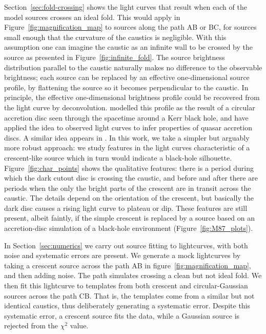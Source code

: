 \documentclass[usenatbib]{mn2e}
\begin{document}
Section~\ref{sec:fold-crossing} shows the light curves that result
when each of the model sources crosses an ideal fold.  This would
apply in Figure~\ref{fig:magnification_map} to sources along the path
AB or BC, for sources small enough that the curvature of the caustics
is negligible.  With this assumption one can imagine the caustic as an
infinite wall to be crossed by the source as presented in
Figure~\ref{fig:infinite_fold}.  The source brightness distribution
parallel to the caustic naturally makes no difference to the
observable brightness; each source can be replaced by an effective
one-dimensional source profile, by flattening the source so it becomes
perpendicular to the caustic.  In principle, the effective
one-dimensional brightness profile could be recovered from the light
curve by deconvolution.  \cite{1999ApJ...524...49A} modelled this
profile as the result of a circular accretion disc seen through the
spacetime around a Kerr black hole, and \cite{2012MNRAS.423..676A}
have applied the idea to observed light curves to infer properties of
quasar accretion discs.  A similar idea appears in
\cite{2013ApJ...769..131C}.  In this work, we take a simpler but
arguably more robust approach: we study features in the light curves
characteristic of a crescent-like source which in turn would indicate
a black-hole silhouette.  Figure~\ref{fig:char_points} shows the
qualitative features: there is a period during which the dark cutout
disc is crossing the caustic, and before and after there are periods
when the only the bright parts of the crescent are in transit across
the caustic.  The details depend on the orientation of the crescent,
but basically the dark disc causes a rising light curve to plateau or
dip.  These features are still present, albeit faintly, if the simple
crescent is replaced by a source based on an accretion-disc simulation
of a black-hole environment (Figure~\ref{fig:M87_plots}).

In Section~\ref{sec:numerics} we carry out source fitting to
lightcurves, with both noise and systematic errors are present.  We
generate a mock lightcurves by taking a crescent source across the
path AB in figure~\ref{fig:magnification_map}, and then adding noise.
The path simulates crossing a clean but not ideal fold.  We then fit
this lightcurve to templates from both crescent and circular-Gaussian
sources across the path CB.  That is, the templates come from a
similar but not identical caustics, thus deliberately generating a
systematic error.  Despite this systematic error, a crescent source
fits the data, while a Gaussian source is rejected from the $\chi^2$
value.
\end{document}
